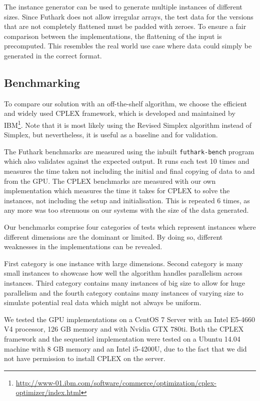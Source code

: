 \newpar
The instance generator can be used to generate multiple instances of different sizes. Since Futhark does not allow irregular arrays, the test data for the versions that are not completely flattened must be padded with zeroes. To ensure a fair comparison between the implementations, the flattening of the input is precomputed. This resembles the real world use case where data could simply be generated in the correct format.

\subsection{Benchmarking}
To compare our solution with an off-the-shelf algorithm, we choose the efficient and widely used CPLEX framework, which is developed and maintained by IBM\footnote{\url{http://www-01.ibm.com/software/commerce/optimization/cplex-optimizer/index.html}}. Note that it is most likely using the Revised Simplex algorithm instead of Simplex, but nevertheless, it is useful as a baseline and for validation.

\newpar The Futhark benchmarks are measured using the inbuilt \texttt{futhark-bench} program which also validates against the expected output. It runs each test 10 times and measures the time taken not including the initial and final copying of data to and from the GPU. The CPLEX benchmarks are measured with our own implementation which measures the time it takes for CPLEX to solve the instances, not including the setup and initialisation. This is repeated 6 times, as any more was too strenuous on our systems with the size of the data generated.

\newpar Our benchmarks comprise four categories of tests which represent instances where different dimensions are the dominant or limited. By doing so, different weaknesses in the implementations can be revealed.

First category is one instance with large dimensions. Second category is many small instances to showcase how well the algorithm handles parallelism across instances. Third category contains many instances of big size to allow for huge parallelism and the fourth category contains many instances of varying size to simulate potential real data which might not always be uniform.

\newpar We tested the GPU implementations on a CentOS 7 Server with an Intel E5-4660 V4 processor, 126 GB memory and with Nvidia GTX 780ti. Both the CPLEX framework and the sequentiel
implementation were tested on a Ubuntu 14.04 machine with 8 GB memory and an Intel i5-4200U, due to the fact that we did not have permission to install CPLEX on the server.
